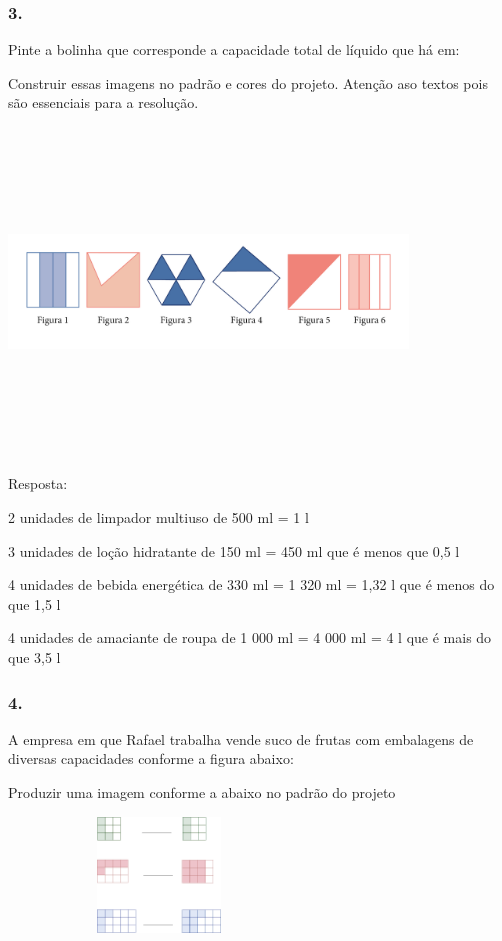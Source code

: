 \subsubsection{3.}\label{section-41}

Pinte a bolinha que corresponde a capacidade total de líquido que há em:

Construir essas imagens no padrão e cores do projeto. Atenção aso textos
pois são essenciais para a resolução.

\includegraphics[width=4.17536in,height=3.42530in]{media/image52.png}

Resposta:

2 unidades de limpador multiuso de 500 ml = 1 l

3 unidades de loção hidratante de 150 ml = 450 ml que é menos que 0,5 l

4 unidades de bebida energética de 330 ml = 1 320 ml = 1,32 l que é
menos do que 1,5 l

4 unidades de amaciante de roupa de 1 000 ml = 4 000 ml = 4 l que é mais
do que 3,5 l

\subsubsection{4.}\label{section-42}

A empresa em que Rafael trabalha vende suco de frutas com embalagens de
diversas capacidades conforme a figura abaixo:

Produzir uma imagem conforme a abaixo no padrão do projeto

\includegraphics[width=3.15027in,height=1.21677in]{media/image53.png}

